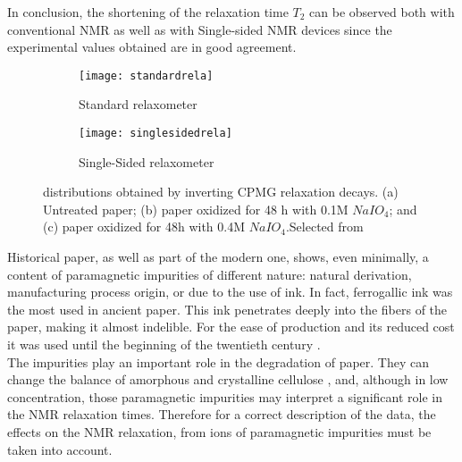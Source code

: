 \documentclass[a4paper,11pt]{report}
\begin{document}
In conclusion, the shortening of the relaxation time $T_2$ can be observed both with conventional NMR as well as with Single-sided NMR devices since the experimental values obtained are in good agreement.

\begin{figure}[h]

\begin{subfigure}{0.5\textwidth}
\texttt{[image: standardrela]} 
\caption{Standard relaxometer}

\end{subfigure}
\begin{subfigure}{0.5\textwidth}
\texttt{[image: singlesidedrela]}
\caption{Single-Sided relaxometer}

\end{subfigure}
 


\caption{distributions obtained by inverting CPMG relaxation decays. (a) Untreated paper; (b) paper oxidized for 48 h with 0.1M $NaIO_4$; and (c) paper oxidized for 48h with 0.4M $NaIO_4$.Selected from \cite{settepaper}}\label{paper1}
\end{figure}
Historical paper, as well as part of the modern one, shows, even minimally, a content of paramagnetic impurities of different nature: natural derivation, manufacturing process origin, or due to the use of ink. In fact, ferrogallic ink was the most used in ancient paper. This ink penetrates deeply into the fibers of the paper, making it almost indelible. For the ease of production and its reduced cost it was used until the beginning of the twentieth century\cite{trepaper} . \\
The impurities play an important role in the degradation of paper. They can change the balance of amorphous and crystalline cellulose , and, although in low concentration, those paramagnetic impurities may interpret a significant role in the NMR relaxation times. Therefore for a correct description of the data, the effects on the NMR relaxation, from ions of paramagnetic impurities must be taken into account\cite{duepaper}.  
\end{document}

